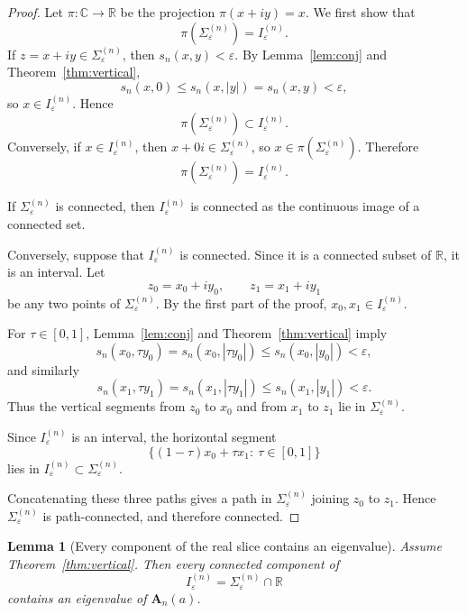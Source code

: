 \documentclass[11pt]{article}
\numberwithin{equation}{section}
\newtheorem{lemma}[theorem]{Lemma}
\newcommand{\R}{\mathbb R}
\newcommand{\C}{\mathbb C}
\newcommand{\A}{\mathbf A}
\begin{document}
\begin{proof}
Let \(\pi:\C\to\R\) be the projection \(\pi(x+iy)=x\).  We first show that
\[
\pi(\Sigma_\varepsilon^{(n)})=I_\varepsilon^{(n)}.
\]
If \(z=x+iy\in\Sigma_\varepsilon^{(n)}\), then \(s_n(x,y)<\varepsilon\).  By
Lemma~\ref{lem:conj} and Theorem~\ref{thm:vertical},
\[
s_n(x,0)\le s_n(x,|y|)=s_n(x,y)<\varepsilon,
\]
so \(x\in I_\varepsilon^{(n)}\).  Hence
\[
\pi(\Sigma_\varepsilon^{(n)})\subset I_\varepsilon^{(n)}.
\]
Conversely, if \(x\in I_\varepsilon^{(n)}\), then \(x+0i\in\Sigma_\varepsilon^{(n)}\), so
\(x\in \pi(\Sigma_\varepsilon^{(n)})\).  Therefore
\[
\pi(\Sigma_\varepsilon^{(n)})=I_\varepsilon^{(n)}.
\]

If \(\Sigma_\varepsilon^{(n)}\) is connected, then
\(I_\varepsilon^{(n)}\) is connected as the continuous image of a connected set.

Conversely, suppose that \(I_\varepsilon^{(n)}\) is connected.  Since it is a connected
subset of \(\R\), it is an interval.  Let
\[
z_0=x_0+iy_0,\qquad z_1=x_1+iy_1
\]
be any two points of \(\Sigma_\varepsilon^{(n)}\).  By the first part of the proof,
\(x_0,x_1\in I_\varepsilon^{(n)}\).

For \(\tau\in[0,1]\), Lemma~\ref{lem:conj} and
Theorem~\ref{thm:vertical} imply
\[
s_n(x_0,\tau y_0)=s_n(x_0,|\tau y_0|)
\le s_n(x_0,|y_0|)<\varepsilon,
\]
and similarly
\[
s_n(x_1,\tau y_1)=s_n(x_1,|\tau y_1|)
\le s_n(x_1,|y_1|)<\varepsilon.
\]
Thus the vertical segments from \(z_0\) to \(x_0\) and from \(x_1\) to \(z_1\) lie in
\(\Sigma_\varepsilon^{(n)}\).

Since \(I_\varepsilon^{(n)}\) is an interval, the horizontal segment
\[
\{(1-\tau)x_0+\tau x_1:\ \tau\in[0,1]\}
\]
lies in \(I_\varepsilon^{(n)}\subset \Sigma_\varepsilon^{(n)}\).

Concatenating these three paths gives a path in \(\Sigma_\varepsilon^{(n)}\) joining
\(z_0\) to \(z_1\).  Hence \(\Sigma_\varepsilon^{(n)}\) is path-connected, and therefore
connected.
\end{proof}

\begin{lemma}[Every component of the real slice contains an eigenvalue]
\label{lem:real-component-eigenvalue}
Assume Theorem~\ref{thm:vertical}. Then every connected component of
\[
I_\varepsilon^{(n)}
=
\Sigma_\varepsilon^{(n)}\cap\R
\]
contains an eigenvalue of \(\A_n(a)\).
\end{lemma}
\end{document}
